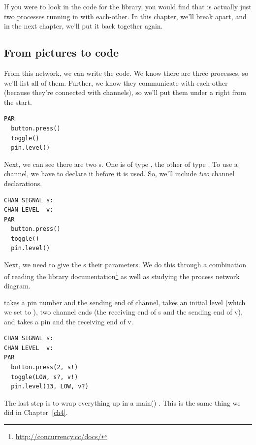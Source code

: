 If you were to look in the code for the \plumbing library, you would find that \tp is actually just two processes running in \PARallel with each-other. In this chapter, we'll break \tp apart, and in the next chapter, we'll put it back together again.

\newpage

\subsection{From pictures to code}
From this network, we can write the code. We know there are three processes, so we'll list all of them. Further, we know they communicate with each-other (because they're connected with channels), so we'll put them under a \PAR right from the start.

\vspace{3mm}
\begin{lstlisting}
PAR
  button.press()
  toggle()
  pin.level()
\end{lstlisting}

Next, we can see there are two {\CHANnel}s. One is of type \SIGNALT, the other of type \LEVELT. To use a channel, we have to declare it before it is used. So, we'll include {\em two} channel declarations.

\vspace{3mm}
\begin{lstlisting}
CHAN SIGNAL s:
CHAN LEVEL  v:
PAR
  button.press()
  toggle()
  pin.level()
\end{lstlisting}

Next, we need to give the {\PROCedure}s their parameters. We do this through a combination of reading the \plumbing library documentation\footnote{\url{http://concurrency.cc/docs/}} as well as studying the process network diagram.

\newpage

\bp takes a pin number and the sending end of channel, \toggle takes an initial level (which we set to \LOW), two channel ends (the receiving end of {\code s} and the sending end of {\code v}), and \pinlevel takes a pin and the receiving end of {\code v}.

\vspace{3mm}
\begin{lstlisting}
CHAN SIGNAL s:
CHAN LEVEL  v:
PAR
  button.press(2, s!)
  toggle(LOW, s?, v!)
  pin.level(13, LOW, v?)
\end{lstlisting}

The last step is to wrap everything up in a {\code main()} \PROCedure. This is the same thing we did in Chapter~\ref{ch4}.

